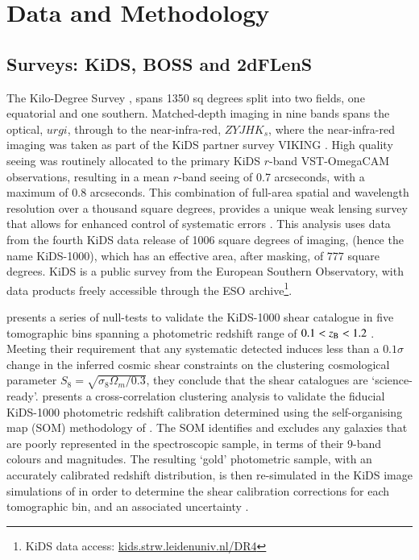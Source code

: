 \section{Data and Methodology}
\label{sec:data}

\subsection{Surveys:  KiDS, BOSS and 2dFLenS}
\label{sec:surveys}

The Kilo-Degree Survey \citep[KiDS,][]{dejong/etal:2013}, spans 1350 sq degrees split into two fields, one
equatorial and one southern.    Matched-depth imaging in nine bands spans the optical,
$urgi$, through to the near-infra-red, $ZYJHK_s$, where the
near-infra-red imaging was taken as part of the KiDS partner survey
VIKING \citep[the VISTA Kilo-degree INfrared Galaxy
survey,][]{edge/etal:2013}.  High quality seeing was
routinely allocated to the primary KiDS $r$-band VST-OmegaCAM observations, resulting in a
mean $r$-band seeing of 0.7 arcseconds, with a maximum of 0.8
arcseconds.  This combination of full-area spatial and wavelength
resolution over a thousand square degrees,
provides a unique weak lensing survey that allows for enhanced
control of systematic errors \citep{giblin/etal:inprep, hildebrandt/etal:inprep}.
This analysis uses data from the fourth KiDS
data release of 1006 square degrees of imaging, (hence the name KiDS-1000), which has an effective
area, after masking, of 777 square degrees.  KiDS is a public survey from the European Southern
Observatory, with data products freely accessible through the ESO
archive\footnote{KiDS data access: \href{http://kids.strw.leidenuniv.nl/DR4}{kids.strw.leidenuniv.nl/DR4}}.   

\citet{giblin/etal:inprep} presents a series of null-tests to validate the KiDS-1000 shear catalogue in five tomographic bins spanning a 
photometric redshift range of $0.1 < z_{\rm B} < 1.2$ \citep[see table 1 of][for details of the properties of each bin]{giblin/etal:inprep}.    
Meeting their requirement that any systematic detected induces less than a $0.1\sigma$ change in the inferred 
cosmic shear constraints on the clustering cosmological parameter $S_8 = \sqrt{\sigma_8 \Omega_m/0.3}$, they conclude that the shear catalogues are `science-ready'.
\citet{hildebrandt/etal:inprep} presents a cross-correlation clustering analysis to validate the fiducial KiDS-1000 photometric redshift calibration determined using the self-organising map (SOM) methodology of \citet{wright/etal:2020}.   The SOM identifies and excludes any galaxies that are poorly represented in the spectroscopic sample, in terms of their 9-band colours and magnitudes. The resulting `gold' photometric sample, with an accurately calibrated redshift distribution, is then re-simulated in the KiDS image simulations of \citet{kannawadi/etal:2019} in order to determine the shear calibration corrections for each tomographic bin, and an associated uncertainty \citep[see][for full details]{giblin/etal:inprep,hildebrandt/etal:inprep}.
 

